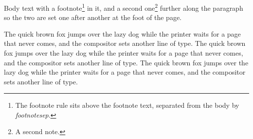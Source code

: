 \documentclass{article}
\begin{document}
Body text with a footnote\footnote{The footnote rule sits above the footnote
text, separated from the body by \emph{footnotesep}.} in it,
and a second one\footnote{A second note.} further along the paragraph so the
two are set one after another at the foot of the page.

The quick brown fox jumps over the lazy dog while the printer waits for a
page that never comes, and the compositor sets another line of type.
The quick brown fox jumps over the lazy dog while the printer waits for a
page that never comes, and the compositor sets another line of type.
The quick brown fox jumps over the lazy dog while the printer waits for a
page that never comes, and the compositor sets another line of type.
\end{document}
